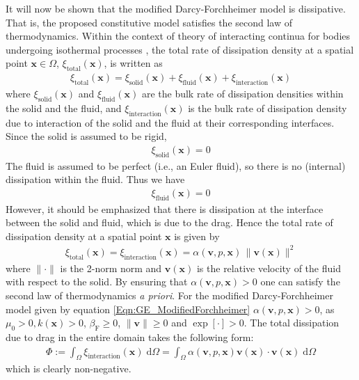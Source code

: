 \documentclass[11pt,reqno]{amsart}
\begin{document}
It will now be shown that the modified Darcy-Forchheimer 
model is dissipative. That is, the proposed constitutive 
model satisfies the second law of thermodynamics. Within 
the context of theory of interacting continua for bodies 
undergoing isothermal processes \cite{Bowen}, the total 
rate of dissipation density at a spatial point $\mathbf{x} 
\in \Omega$, $\xi_{\mathrm{total}}(\mathbf{x})$, is written 
as
\begin{align}
  \xi_{\mathrm{total}}(\mathbf{x}) = \xi_{\mathrm{solid}}
  (\mathbf{x}) + \xi_{\mathrm{fluid}}(\mathbf{x}) + 
  \xi_{\mathrm{interaction}}(\mathbf{x})
\end{align}
where $\xi_{\mathrm{solid}}(\mathbf{x})$ and $\xi_{\mathrm{fluid}}
(\mathbf{x})$ are the bulk rate of dissipation densities within the 
solid and the fluid, and $\xi_{\mathrm{interaction}}(\mathbf{x})$ 
is the bulk rate of dissipation density due to interaction of the 
solid and the fluid at their corresponding interfaces. 
Since the solid is assumed to be rigid,  
\begin{align}
  \xi_{\mathrm{solid}}(\mathbf{x}) = 0
\end{align}
The fluid is assumed to be perfect (i.e., an Euler 
fluid), so there is no (internal) dissipation within 
the fluid. Thus we have 
\begin{align}
  \xi_{\mathrm{fluid}}(\mathbf{x}) = 0
\end{align}
However, it should be emphasized that there is 
dissipation at the interface between the solid 
and fluid, which is due to the drag. Hence the 
total rate of dissipation density at a spatial 
point $\mathbf{x}$ is given by 
\begin{align} 
  \xi_{\mathrm{total}}(\mathbf{x}) = \xi_{\mathrm{interaction}} 
  (\mathbf{x}) = \alpha(\mathbf{v},p,\mathbf{x}) \, \| 
  \mathbf{v}(\mathbf{x}) \| ^ 2
\end{align}
where $\| \cdot \|$ is the 2-norm norm and $\mathbf{v}
(\mathbf{x})$ is the relative velocity of the fluid 
with respect to the solid. By ensuring that $\alpha
(\mathbf{v},p,\mathbf{x}) > 0$ one can satisfy the 
second law of thermodynamics \emph{a priori}. For the 
modified Darcy-Forchheimer model given by equation 
\eqref{Eqn:GE_ModifiedForchheimer} $\alpha(\mathbf{v},p,\mathbf{x}) 
> 0$, as $\mu_0 > 0, k(\mathbf{x}) > 0$, $\beta_{\mathrm{F}} 
\geq 0$, $\|\mathbf{v}\| \geq 0$ and $\exp[\cdot] > 0$.
The total dissipation due to drag in the entire domain 
takes the following form:
\begin{align}
  \Phi := \int_{\Omega} \xi_{\mathrm{interaction}}
  (\mathbf{x}) \; \mathrm{d} \Omega = \int_{\Omega} 
  \alpha(\mathbf{v},p,\mathbf{x}) \mathbf{v}(\mathbf{x}) 
  \cdot \mathbf{v}(\mathbf{x}) \; \mathrm{d} \Omega
\end{align}
which is clearly non-negative. 
\end{document}
